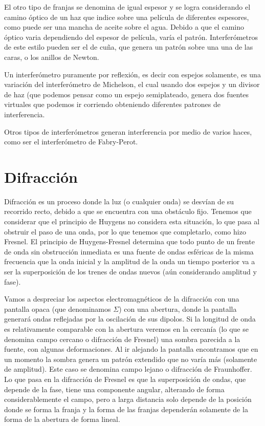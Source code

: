 \documentclass[a4paper,spanish]{article}
\numberwithin{equation}{section}
\begin{document}
	El otro tipo de franjas se denomina de igual espesor y se logra considerando el camino \'optico de un haz que indice sobre una pel\'icula de diferentes espesores, como puede ser una mancha de aceite sobre el agua. Debido a que el camino \'optico varia dependiendo del espesor de pel\'icula, var\'ia el patr\'on. Interfer\'ometros de este estilo pueden ser el de cu\~na, que genera un patr\'on sobre una una de las caras, o los anillos de Newton.
	
	Un interfer\'ometro puramente por reflexi\'on, es decir con espejos solamente, es una variaci\'on del interfer\'ometro de Michelson, el cual usando dos espejos y un divisor de haz (que podemos pensar como un espejo semiplateado, genera dos fuentes virtuales que podemos ir corriendo obteniendo diferentes patrones de interferencia.
	
	Otros tipos de interfer\'ometros generan interferencia por medio de varios haces, como ser el interfer\'ometro de Fabry-Perot.
\section{Difracci\'on}
	\label{sec:difraccion}
	Difracci\'on es un proceso donde la luz (o cualquier onda) se desv\'ian de su recorrido recto, debido a que se encuentra con una obst\'aculo fijo. Tenemos que considerar que el principio de Huygens no considera esta situaci\'on, lo que pasa al obstruir el paso de una onda, por lo que tenemos que completarlo, como hizo Fresnel. El principio de Huygens-Fresnel determina que todo punto de un frente de onda sin obstrucci\'on inmediata es una fuente de ondas esf\'ericas de la misma frecuencia que la onda inicial y la amplitud de la onda un tiempo posterior va a ser la superposici\'on de los trenes de ondas nuevos (a\'un considerando amplitud y fase).
	
	Vamos a despreciar los aspectos electromagn\'eticos de la difracci\'on con una pantalla opaca (que denominamos $\Sigma$) con una abertura, donde la pantalla generar\'a ondas reflejadas por la oscilaci\'on de sus dipolos. Si la longitud de onda es relativamente comparable con la abertura veremos en la cercan\'ia (lo que se denomina campo cercano o difracci\'on de Fresnel) una sombra parecida a la fuente, con algunas deformaciones. Al ir alejando la pantalla encontramos que en un momento la sombra genera un patr\'on extendido que no var\'ia m\'as (solamente de amplitud). Este caso se denomina campo lejano o difracci\'on de Fraunhoffer. Lo que pasa en la difracci\'on de Fresnel es que la superposici\'on de ondas, que depende de la fase, tiene una componente angular, alterando de forma considerablemente el campo, pero a larga distancia solo depende de la posici\'on donde se forma la franja y la forma de las franjas depender\'an solamente de la forma de la abertura de forma lineal.
	
\end{document}
